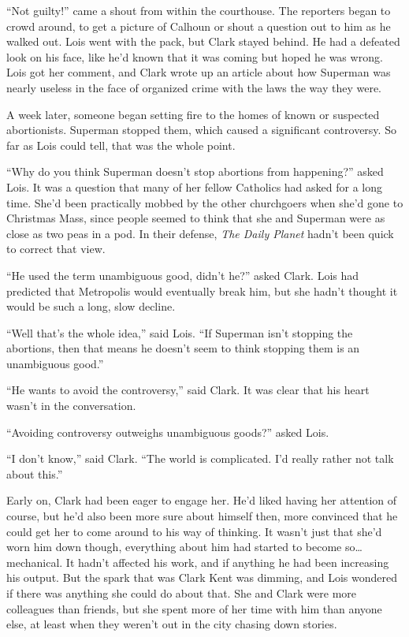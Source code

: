 \documentclass[ebook,12pt]{memoir}
\begin{document}
``Not guilty!'' came a shout from within the courthouse. The reporters
began to crowd around, to get a picture of Calhoun or shout a question
out to him as he walked out. Lois went with the pack, but Clark stayed
behind. He had a defeated look on his face, like he'd known that it was
coming but hoped he was wrong. Lois got her comment, and Clark wrote up
an article about how Superman was nearly useless in the face of
organized crime with the laws the way they were.

A week later, someone began setting fire to the homes of known or
suspected abortionists. Superman stopped them, which caused a
significant controversy. So far as Lois could tell, that was the whole
point.

``Why do you think Superman doesn't stop abortions from happening?''
asked Lois. It was a question that many of her fellow Catholics had
asked for a long time. She'd been practically mobbed by the other
churchgoers when she'd gone to Christmas Mass, since people seemed to
think that she and Superman were as close as two peas in a pod. In their
defense, \emph{The Daily Planet} hadn't been quick to correct that view.

``He used the term unambiguous good, didn't he?'' asked Clark. Lois had
predicted that Metropolis would eventually break him, but she hadn't
thought it would be such a long, slow decline.

``Well that's the whole idea,'' said Lois. ``If Superman isn't stopping
the abortions, then that means he doesn't seem to think stopping them is
an unambiguous good.''

``He wants to avoid the controversy,'' said Clark. It was clear that his
heart wasn't in the conversation.

``Avoiding controversy outweighs unambiguous goods?'' asked Lois.

``I don't know,'' said Clark. ``The world is complicated. I'd really
rather not talk about this.''

Early on, Clark had been eager to engage her. He'd liked having her
attention of course, but he'd also been more sure about himself then,
more convinced that he could get her to come around to his way of
thinking. It wasn't just that she'd worn him down though, everything
about him had started to become so\ldots{} mechanical. It hadn't
affected his work, and if anything he had been increasing his output.
But the spark that was Clark Kent was dimming, and Lois wondered if
there was anything she could do about that. She and Clark were more
colleagues than friends, but she spent more of her time with him than
anyone else, at least when they weren't out in the city chasing down
stories.
\end{document}
